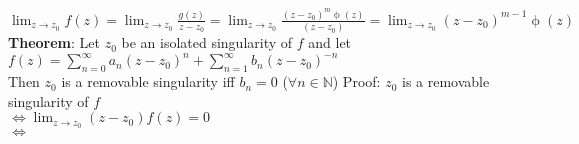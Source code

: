 $\lim_{z\rightarrow z_0} f(z)=\lim_{z\rightarrow z_0} \frac{g(z)}{z-z_0}=\lim_{z\rightarrow z_0} \frac{(z-z_0)^m\upphi(z)}{(z-z_0)}= \lim_{z\rightarrow z_0} (z-z_0)^{m-1} \upphi(z)$\\
\textbf{Theorem}: Let $z_0$ be an isolated singularity of $f$ and let \\
$f(z)= \sum_{n=0}^{\infty} a_n(z-z_0)^n + \sum_{n=1}^{\infty} b_n(z-z_0)^{-n}$\\
Then $z_0$ is a removable singularity iff $b_n=0$ ($\forall n\in \mathbb{N}$)
Proof: $z_0$ is a removable singularity of $f$ \\
$\Leftrightarrow \lim_{z\rightarrow z_0} (z-z_0) f(z)=0$\\
$\Leftrightarrow $
